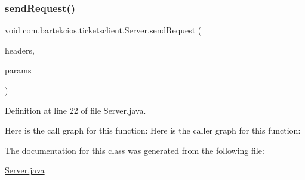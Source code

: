 \subsubsection{\texorpdfstring{send\+Request()}{sendRequest()}}
{\footnotesize\ttfamily void com.\+bartekcios.\+ticketsclient.\+Server.\+send\+Request (\begin{DoxyParamCaption}\item[{Array\+List$<$ Name\+Value\+Pair $>$}]{headers,  }\item[{Array\+List$<$ Name\+Value\+Pair $>$}]{params }\end{DoxyParamCaption})}



Definition at line 22 of file Server.\+java.

Here is the call graph for this function\+:
Here is the caller graph for this function\+:


The documentation for this class was generated from the following file\+:\begin{DoxyCompactItemize}
\item 
\hyperlink{_server_8java}{Server.\+java}\end{DoxyCompactItemize}
